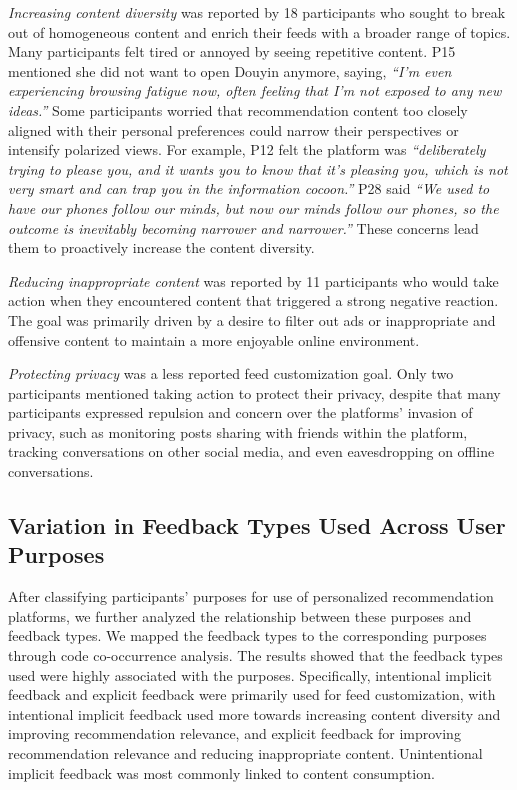 \textit{Increasing content diversity} was reported by 18 participants who sought to break out of homogeneous content and enrich their feeds with a broader range of topics. Many participants felt tired or annoyed by seeing repetitive content. P15 mentioned she did not want to open Douyin anymore, saying, \textit{``I'm even experiencing browsing fatigue now, often feeling that I’m not exposed to any new ideas.''} Some participants worried that recommendation content too closely aligned with their personal preferences could narrow their perspectives or intensify polarized views. For example, P12 felt the platform was \textit{``deliberately trying to please you, and it wants you to know that it's pleasing you, which is not very smart and can trap you in the information cocoon.''} P28 said \textit{``We used to have our phones follow our minds, but now our minds follow our phones, so the outcome is inevitably becoming narrower and narrower.''} These concerns lead them to proactively increase the content diversity.

\textit{Reducing inappropriate content} was reported by 11 participants who would take action when they encountered content that triggered a strong negative reaction. The goal was primarily driven by a desire to filter out ads or inappropriate and offensive content to maintain a more enjoyable online environment. 

\textit{Protecting privacy} was a less reported feed customization goal. Only two participants mentioned taking action to protect their privacy, despite that many participants expressed repulsion and concern over the platforms' invasion of privacy, such as monitoring posts sharing with friends within the platform, tracking conversations on other social media, and even eavesdropping on offline conversations.

\subsection{Variation in Feedback Types Used Across User Purposes}
After classifying participants' purposes for use of personalized recommendation platforms, we further analyzed the relationship between these purposes and feedback types. We mapped the feedback types to the corresponding purposes through code co-occurrence analysis. The results showed that the feedback types used were highly associated with the purposes. Specifically, intentional implicit feedback and explicit feedback were primarily used for feed customization, with intentional implicit feedback used more towards increasing content diversity and improving recommendation relevance, and explicit feedback for improving recommendation relevance and reducing inappropriate content. Unintentional implicit feedback was most commonly linked to content consumption.




